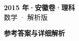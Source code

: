 \documentclass[zihao=-4, a4paper]{ctexart}
\begin{document}
\begin{center}
  {\Large\bfseries 2015 年·安徽卷·理科}\\[4pt]
  {\large 数学 · 解析版}
\end{center}
\medskip
{}

\clearpage
{}
\begin{center}{\Large\bfseries 参考答案与详细解析}\end{center}
\medskip

\end{document}
